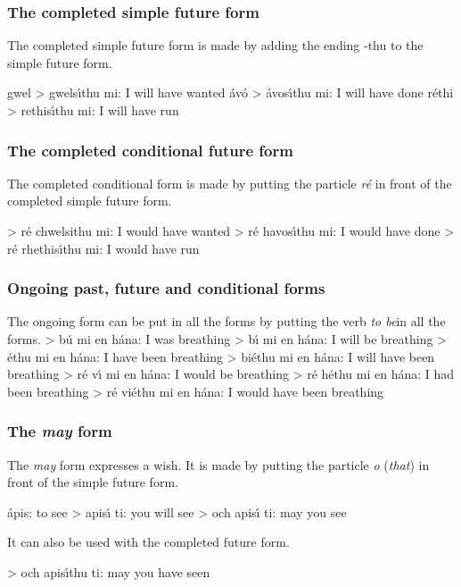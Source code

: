 \subsubsection{The completed simple future form}

The completed simple future form is made by adding the ending -thu to the simple future form.

gwel > gwels\'{\i}thu mi: I will have wanted
\'{a}v\'{o} > \'{a}vos\'{\i}thu mi: I will have done
r\'{e}thi > rethis\'{\i}thu mi: I will have run

\subsubsection{The completed conditional future form}

The completed conditional form is made by putting the particle \textit{r\'{e}} in front of the completed simple future form.

> r\'{e} chwelsithu mi: I would have wanted
> r\'{e} havos\'{\i}thu mi: I would have done
> r\'{e} rhethis\'{\i}thu mi: I would have run

\subsubsection{Ongoing past, future and conditional forms}

The ongoing form can be put in all the forms by putting the verb \textit{to be}in all the forms.
> b\'{u} mi en h\'{a}na: I was breathing
> b\'{\i} mi en h\'{a}na: I will be breathing
> \'{e}thu mi en h\'{a}na: I have been breathing
> bi\'{e}thu mi en h\'{a}na: I will have been breathing
> r\'{e} v\'{\i} mi en h\'{a}na: I would be breathing
> r\'{e} h\'{e}thu mi en h\'{a}na: I had been breathing
> r\'{e} vi\'{e}thu mi en h\'{a}na: I would have been breathing

\subsubsection{The \textit{may} form}

The \textit{may} form expresses a wish. It is made by putting the particle \textit{o} (\textit{that}) in front of the simple future form.

\'{a}pis: to see
> apis\'{\i} ti: you will see
> och apis\'{\i} ti: may you see

It can also be used with the completed future form.

> och apis\'{\i}thu ti: may you have seen

